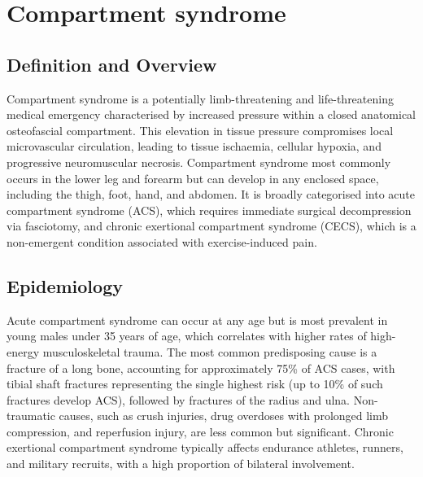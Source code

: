 \chapter{Compartment syndrome}

\section*{Definition and Overview}
Compartment syndrome is a potentially limb-threatening and life-threatening medical emergency characterised by increased pressure within a closed anatomical osteofascial compartment. This elevation in tissue pressure compromises local microvascular circulation, leading to tissue ischaemia, cellular hypoxia, and progressive neuromuscular necrosis. Compartment syndrome most commonly occurs in the lower leg and forearm but can develop in any enclosed space, including the thigh, foot, hand, and abdomen. It is broadly categorised into acute compartment syndrome (ACS), which requires immediate surgical decompression via fasciotomy, and chronic exertional compartment syndrome (CECS), which is a non-emergent condition associated with exercise-induced pain.

\section*{Epidemiology}
Acute compartment syndrome can occur at any age but is most prevalent in young males under 35 years of age, which correlates with higher rates of high-energy musculoskeletal trauma. The most common predisposing cause is a fracture of a long bone, accounting for approximately 75\% of ACS cases, with tibial shaft fractures representing the single highest risk (up to 10\% of such fractures develop ACS), followed by fractures of the radius and ulna. Non-traumatic causes, such as crush injuries, drug overdoses with prolonged limb compression, and reperfusion injury, are less common but significant. Chronic exertional compartment syndrome typically affects endurance athletes, runners, and military recruits, with a high proportion of bilateral involvement.

